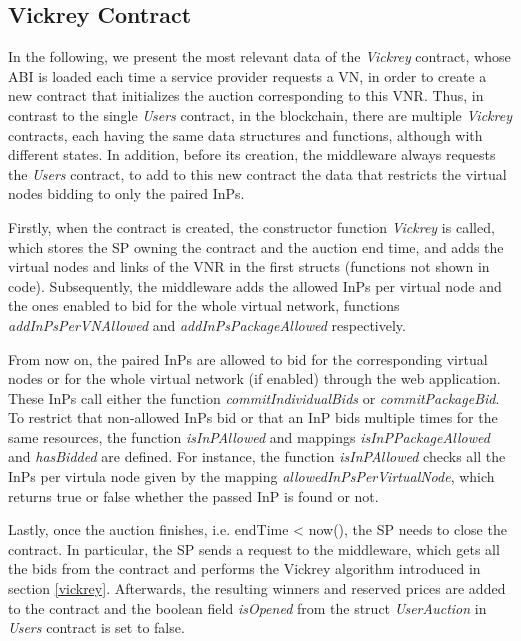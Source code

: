 \subsection{Vickrey Contract} \label{vickreyContract}

In the following, we present the most relevant data of the \textit{Vickrey} contract, whose ABI is loaded each time a service provider requests a VN, in order to create a new contract that initializes the auction corresponding to this VNR. Thus, in contrast to the single \textit{Users} contract, in the blockchain, there are multiple \textit{Vickrey} contracts, each having the same data structures and functions, although with different states. In addition, before its creation, the middleware always requests the \textit{Users} contract, to add to this new contract the data that restricts the virtual nodes bidding to only the paired InPs.

Firstly, when the contract is created, the constructor function \textit{Vickrey} is called, which stores the SP owning the contract and the auction end time, and adds the virtual nodes and links of the VNR in the first structs (functions not shown in code). Subsequently, the middleware adds the allowed InPs per virtual node and the ones enabled to bid for the whole virtual network, functions \textit{addInPsPerVNAllowed} and \textit{addInPsPackageAllowed} respectively. 

From now on, the paired InPs are allowed to bid for the corresponding virtual nodes or for the whole virtual network (if enabled) through the web application. These InPs call either the function \textit{commitIndividualBids} or \textit{commitPackageBid}. To restrict that non-allowed InPs bid or that an InP bids multiple times for the same resources, the function \textit{isInPAllowed} and mappings \textit{isInPPackageAllowed} and \textit{hasBidded} are defined. For instance, the function \textit{isInPAllowed} checks all the InPs per virtula node given by the mapping \textit{allowedInPsPerVirtualNode}, which returns true or false whether the passed InP is found or not.

Lastly, once the auction finishes, i.e. endTime < now(), the SP needs to close the contract. In particular, the SP sends a request to the middleware, which gets all the bids from the contract and performs the Vickrey algorithm introduced in section \ref{vickrey}. Afterwards, the resulting winners and reserved prices are added to the contract and the boolean field \textit{isOpened} from the struct \textit{UserAuction} in \textit{Users} contract is set to false.

